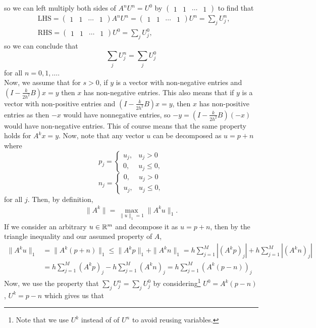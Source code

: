 \documentclass{article}
\begin{document}
so we can left multiply both sides of $A^nU^n=U^0$ by $\begin{pmatrix} 1 & 1 & \cdots & 1 \end{pmatrix}$ to find that 
\begin{align*}
	&\text{LHS}=\begin{pmatrix} 1 & 1 & \cdots & 1 \end{pmatrix}A^nU^n = \begin{pmatrix} 1 & 1 & \cdots & 1 \end{pmatrix}U^n=\sum_j U_j^n,\\
	&\text{RHS}=\begin{pmatrix} 1 & 1 & \cdots & 1 \end{pmatrix}U^0=\sum_j U_j^0,
\end{align*}
so we can conclude that
\[
\sum_j U_j^n = \sum_j U_j^0
\]
for all $n=0,1,\ldots$. \\
Now, we assume that for $s > 0$, if $y$ is a vector with non-negative entries and $\left( I - \frac{k}{2h^2}B \right) x = y$ then $x$ has non-negative entries. This also means that if $y$ is a vector with non-positive entries and $\left( I - \frac{k}{2h^2}B \right) x = y$, then $x$ has non-positive entries as then $-x$ would have nonnegative entries, so $-y=\left( I - \frac{k}{2h^2}B \right) (-x)$ would have non-negative entries. This of course means that the same property holds for $A^kx=y$. Now, note that any vector $u$ can be decomposed as $u=p+n$ where
\[
p_j=\begin{cases}
	u_j,  &u_j>0\\
	0,  &u_j\leq0,
\end{cases}
\]
\[
n_j=\begin{cases}
	0,  &u_j>0\\
	u_j,  &u_j\leq0,
\end{cases}
\]
for all $j$. Then, by definition,
\begin{align*}
\|A^k\|=\max_{\|u\|_1=1}\|A^ku\|_1.
\end{align*}
If we consider an arbitrary $u\in\mathbb{R}^{m}$ and decompose it as $u=p+n$, then by the triangle inequality and our assumed property of $A$, 
\begin{align*}
\|A^ku\|_1&=\|A^k(p+n)\|_1\leq\|A^kp\|_1+\|A^kn\|_1=h\sum_{j=1}^M|(A^kp)_j|+h\sum_{j=1}^M|(A^kn)_j|\\&=
h\sum_{j=1}^M(A^kp)_j-h\sum_{j=1}^M(A^kn)_j=h\sum_{j=1}^M(A^k(p-n))_j
\end{align*}
Now, we use the property that $\sum_j U_j^n = \sum_j U_j^0$ by considering\footnote{Note that we use $U^k$ instead of of $U^n$ to avoid reusing variables.} $U^0=A^k(p-n)$, $U^k=p-n$ which gives us that
\end{document}
